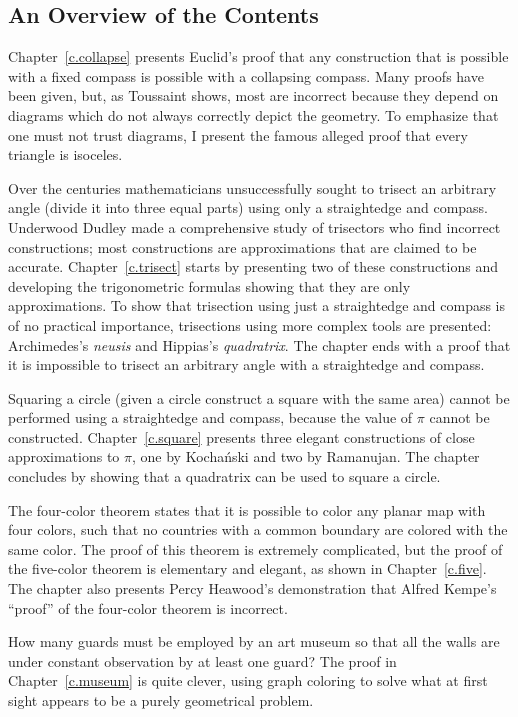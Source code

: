 \subsection*{An Overview of the Contents}

Chapter~\ref{c.collapse} presents Euclid's proof that any construction that is possible with a fixed compass is possible with a collapsing compass. Many proofs have been given, but, as Toussaint shows, most are incorrect because they depend on diagrams which do not always correctly depict the geometry. To emphasize that one must not trust diagrams, I present the famous alleged proof that every triangle is isoceles. 

Over the centuries mathematicians unsuccessfully sought to trisect an arbitrary angle (divide it into three equal parts) using only a straightedge and compass. Underwood Dudley made a comprehensive study of trisectors who find incorrect constructions; most constructions are approximations that are claimed to be accurate. Chapter~\ref{c.trisect} starts by presenting two of these constructions and developing the trigonometric formulas showing that they are only approximations. To show that trisection using just a straightedge and compass is of no practical importance, trisections using more complex tools are presented: Archimedes's \emph{neusis} and Hippias's \emph{quadratrix}. The chapter ends with a proof that it is impossible to trisect an arbitrary angle with a straightedge and compass. 

Squaring a circle (given a circle construct a square with the same area) cannot be performed using a straightedge and compass, because the value of $\pi$ cannot be constructed. Chapter~\ref{c.square} presents three elegant constructions of close approximations to $\pi$, one by Kocha\'{n}ski and two by Ramanujan. The chapter concludes by showing that a quadratrix can be used to square a circle.

The four-color theorem states that it is possible to color any planar map with four colors, such that no countries with a common boundary are colored with the same color. The proof of this theorem is extremely complicated, but the proof of the five-color theorem is elementary and elegant, as shown in Chapter~\ref{c.five}. The chapter also presents Percy Heawood's demonstration that Alfred Kempe's ``proof'' of the four-color theorem is incorrect.

How many guards must be employed by an art museum so that all the walls are under constant observation by at least one guard? The proof in Chapter~\ref{c.museum} is quite clever, using graph coloring to solve what at first sight appears to be a purely geometrical problem.


